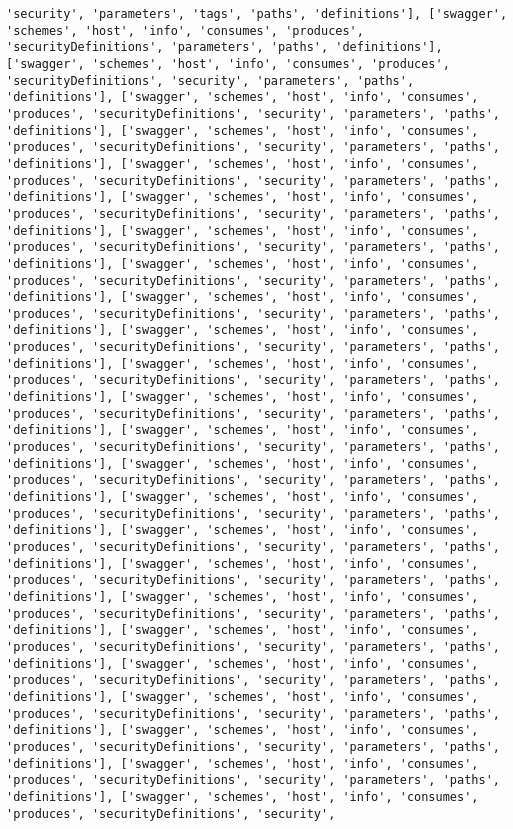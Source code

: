 \documentclass[11pt]{article}
\begin{document}
\begin{Verbatim}[commandchars=\\\{\}]
'security', 'parameters', 'tags', 'paths', 'definitions'], ['swagger', 'schemes', 'host', 'info', 'consumes', 'produces', 'securityDefinitions', 'parameters', 'paths', 'definitions'], ['swagger', 'schemes', 'host', 'info', 'consumes', 'produces', 'securityDefinitions', 'security', 'parameters', 'paths', 'definitions'], ['swagger', 'schemes', 'host', 'info', 'consumes', 'produces', 'securityDefinitions', 'security', 'parameters', 'paths', 'definitions'], ['swagger', 'schemes', 'host', 'info', 'consumes', 'produces', 'securityDefinitions', 'security', 'parameters', 'paths', 'definitions'], ['swagger', 'schemes', 'host', 'info', 'consumes', 'produces', 'securityDefinitions', 'security', 'parameters', 'paths', 'definitions'], ['swagger', 'schemes', 'host', 'info', 'consumes', 'produces', 'securityDefinitions', 'security', 'parameters', 'paths', 'definitions'], ['swagger', 'schemes', 'host', 'info', 'consumes', 'produces', 'securityDefinitions', 'security', 'parameters', 'paths', 'definitions'], ['swagger', 'schemes', 'host', 'info', 'consumes', 'produces', 'securityDefinitions', 'security', 'parameters', 'paths', 'definitions'], ['swagger', 'schemes', 'host', 'info', 'consumes', 'produces', 'securityDefinitions', 'security', 'parameters', 'paths', 'definitions'], ['swagger', 'schemes', 'host', 'info', 'consumes', 'produces', 'securityDefinitions', 'security', 'parameters', 'paths', 'definitions'], ['swagger', 'schemes', 'host', 'info', 'consumes', 'produces', 'securityDefinitions', 'security', 'parameters', 'paths', 'definitions'], ['swagger', 'schemes', 'host', 'info', 'consumes', 'produces', 'securityDefinitions', 'security', 'parameters', 'paths', 'definitions'], ['swagger', 'schemes', 'host', 'info', 'consumes', 'produces', 'securityDefinitions', 'security', 'parameters', 'paths', 'definitions'], ['swagger', 'schemes', 'host', 'info', 'consumes', 'produces', 'securityDefinitions', 'security', 'parameters', 'paths', 'definitions'], ['swagger', 'schemes', 'host', 'info', 'consumes', 'produces', 'securityDefinitions', 'security', 'parameters', 'paths', 'definitions'], ['swagger', 'schemes', 'host', 'info', 'consumes', 'produces', 'securityDefinitions', 'security', 'parameters', 'paths', 'definitions'], ['swagger', 'schemes', 'host', 'info', 'consumes', 'produces', 'securityDefinitions', 'security', 'parameters', 'paths', 'definitions'], ['swagger', 'schemes', 'host', 'info', 'consumes', 'produces', 'securityDefinitions', 'security', 'parameters', 'paths', 'definitions'], ['swagger', 'schemes', 'host', 'info', 'consumes', 'produces', 'securityDefinitions', 'security', 'parameters', 'paths', 'definitions'], ['swagger', 'schemes', 'host', 'info', 'consumes', 'produces', 'securityDefinitions', 'security', 'parameters', 'paths', 'definitions'], ['swagger', 'schemes', 'host', 'info', 'consumes', 'produces', 'securityDefinitions', 'security', 'parameters', 'paths', 'definitions'], ['swagger', 'schemes', 'host', 'info', 'consumes', 'produces', 'securityDefinitions', 'security', 'parameters', 'paths', 'definitions'], ['swagger', 'schemes', 'host', 'info', 'consumes', 'produces', 'securityDefinitions', 'security', 'parameters', 'paths', 'definitions'], ['swagger', 'schemes', 'host', 'info', 'consumes', 'produces', 'securityDefinitions', 'security', 
\end{Verbatim}
\end{document}
